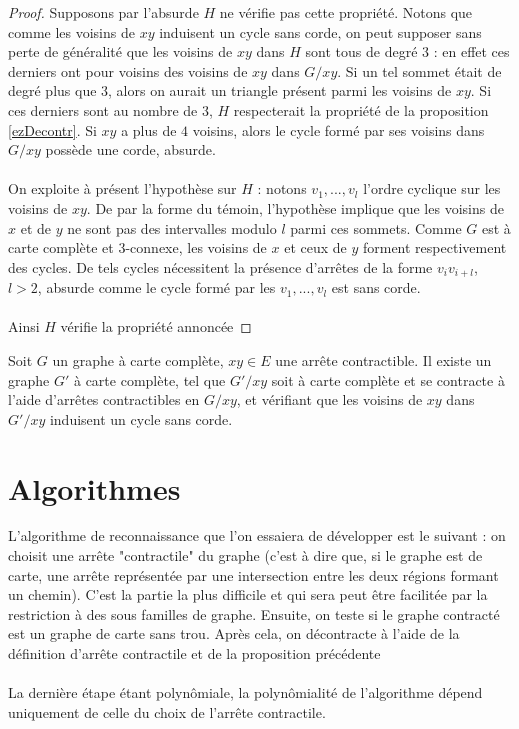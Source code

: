 \documentclass{scrartcl}
\begin{document}
\begin{flushleft}
\begin{proof}
    Supposons par l'absurde $H$ ne vérifie pas cette propriété. Notons que comme les voisins de $xy$
    induisent un cycle sans corde, on peut supposer sans perte de généralité que les voisins de $xy$ dans $H$
    sont tous de degré $3$ : en effet ces derniers ont pour voisins des voisins de $xy$ dans $G / xy$.
    Si un tel sommet était de degré plus que $3$, alors on aurait un triangle présent parmi les voisins de $xy$.
    Si ces derniers sont au nombre de $3$, $H$ respecterait la propriété de la proposition \ref{ezDecontr}.
    Si $xy$ a plus de $4$ voisins, alors le cycle formé par ses voisins dans $G / xy$ possède une corde, absurde.
    \\~\\
    On exploite à présent l'hypothèse sur $H$ : notons $v_1, ..., v_l$ l'ordre cyclique sur les voisins de $xy$.
    De par la forme du témoin, l'hypothèse implique que les voisins de $x$ et de $y$ ne sont pas des intervalles
    modulo $l$ parmi ces sommets. Comme $G$ est à carte complète et $3$-connexe, les voisins de $x$ et ceux de $y$
    forment respectivement des cycles. De tels cycles nécessitent la présence d'arrêtes de la forme $v_i v_{i+l}$,
    $l > 2$, absurde comme le cycle formé par les $v_1, ..., v_l$ est sans corde.
    \\~\\
    Ainsi $H$ vérifie la propriété annoncée
\end{proof}

\begin{lem}
    Soit $G$ un graphe à carte complète, $xy \in E$ une arrête contractible. Il existe un graphe $G'$
    à carte complète, tel que $G' / xy$ soit à carte complète et se contracte à l'aide d'arrêtes contractibles
    en $G / xy$, et vérifiant que les voisins de $xy$ dans $G' / xy$ induisent un cycle sans corde.
\end{lem}

\section{Algorithmes}

L'algorithme de reconnaissance que l'on essaiera de développer est le suivant : on choisit une arrête "contractile" du graphe
(c'est à dire que, si le graphe est de carte, une arrête représentée par une intersection entre les deux régions formant
un chemin). C'est la partie la plus difficile et qui sera peut être facilitée par la restriction à des sous familles de graphe.
Ensuite, on teste si le graphe contracté est un graphe de carte sans trou. Après cela, on décontracte à l'aide de la définition
d'arrête contractile et de la proposition précédente
\\~\\
La dernière étape étant polynômiale, la polynômialité de l'algorithme dépend uniquement de celle du choix de l'arrête contractile.


\end{flushleft}
\end{document}
